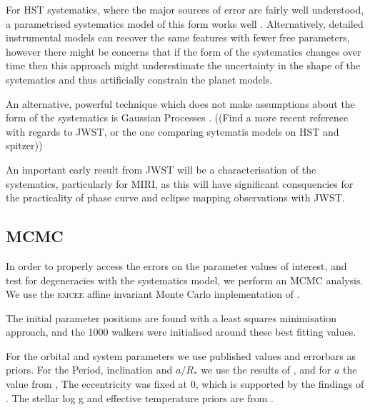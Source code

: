 \documentclass[a4paper,fleqn,usenatbib]{mnras}
\begin{document}
For HST systematics, where the major sources of error are fairly well understood, a parametrised systematics model of this form works well \citet{Wakeford2016}. Alternatively, detailed instrumental models can recover the same features with fewer free parameters, however there might be concerns that if the form of the systematics changes over time then this approach might underestimate the uncertainty in the shape of the systematics and thus artificially constrain the planet models.

An alternative, powerful technique which does not make assumptions about the form of the systematics is Gaussian Processes \citep[e.g.][]{Gibson2012a}. ((Find a more recent reference with regards to JWST, or the one comparing sytematis models on HST and spitzer))

An important early result from JWST will be a characterisation of the systematics, particularly for MIRI, as this will have significant consquencies for the practicality of phase curve and eclipse mapping observations with JWST.

\subsection{MCMC}\label{sec:MCMC}

In order to properly access the errors on the parameter values of interest, and test for degeneracies with the systematics model, we perform an MCMC analysis. We use the \textsc{emcee} affine invariant Monte Carlo implementation of \citet{Foreman-Mackey2013}.

The initial parameter positions are found with a least squares minimisation approach, and the 1000 walkers were initialised around these best fitting values.

For the orbital and system parameters we use published values and errorbars as priors. For the Period, inclination and $a/R_*$ we use the results of \citet{Hoyer2016}, and for $a$ the value from \citet{Hellier2011a}, The eccentricity was fixed at 0, which is supported by the findings of \citet{Hoyer2016}. The stellar log g and effective temperature priors are from \citet{Gillon2012}.
\end{document}
